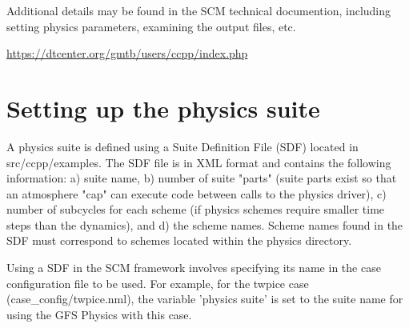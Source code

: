 
Additional details may be found in the SCM technical documention, including setting physics parameters, examining the output files, etc.  

\url{https://dtcenter.org/gmtb/users/ccpp/index.php}


\section{Setting up the physics suite}
A physics suite is defined using a Suite Definition File (SDF) located in
src/ccpp/examples. The SDF file is in XML format and contains the following information: a) suite name, b) number of suite
"parts" (suite parts exist so that an atmosphere "cap" can execute code between
calls to the physics driver), c) number of subcycles for each scheme (if
physics schemes require smaller time steps than the dynamics), and d) the scheme
names. Scheme names found in the SDF must correspond to schemes
located within the physics directory.

Using a SDF in the SCM framework involves specifying its name in the case
configuration file to be used. For example, for the twpice case
(case\_config/twpice.nml), the variable 'physics suite' is set to the 
suite name for using the GFS Physics with this case. 







